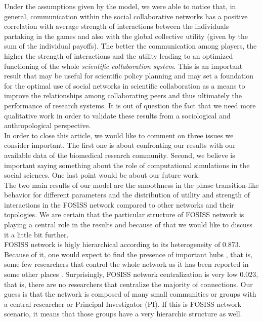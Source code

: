 \documentclass[11pt]{article}
\begin{document}
{\color{red}Under the assumptions given by the model, we were able to notice
  that, in general, communication within the social
collaborative networks has a positive correlation with average strength of interactions between the individuals partaking in the games and
also with the global collective utility (given by the sum of the individual payoffs). The better the
communication among players, the higher the strength of interactions and the utility leading to an optimized functioning of the whole
\emph{scientific collaboration system}. This is an important result that may be useful for scientific policy planning
and may set a foundation for the optimal use of social networks in scientific collaboration as a means to improve the
relationships among collaborating peers and thus ultimately the performance of research systems. It is out of question
the fact that we need more qualitative work in order to validate these results from a sociological and anthropological
perspective.\\ %

{\color{red}In order to close this article, we would like to comment on three issues we consider important. The first one is about
confronting our results with our available data of the biomedical research community. Second, we believe is important
saying something about the role of computational simulations in the social sciences. One last point would be about our
future work.}\\


{\color{red}The two main results of our model are the smoothness in the phase transition-like behavior for different parameters and the distribution of utility and strength of interactions in the FOSISS network compared to other networks and their topologies. We are certain that the particular structure of FOSISS network is playing a central role in the results and because of that we would like to discuss it a little bit further.}\\

{\color{red}FOSISS network is higly hierarchical according to its heterogeneity of $0.873$. Because of it, one would
  expect to find the presence of important hubs \cite{Wu-etal2008}, that is, some few researchers that control the whole
  network as it has been reported in some other places \cite{yousefi-etal2008}. Surprisingly, FOSISS network
  centralization is very low $0.023$, that is, there are no researchers that centralize the majority of connections. Our
  guess is that the network is composed of many small communities or groups with a central researcher or Principal
  Investigator (PI). If this is FOSISS network scenario, it means that those groups have a very hierarchic structure as well.}\\

}
\end{document}
